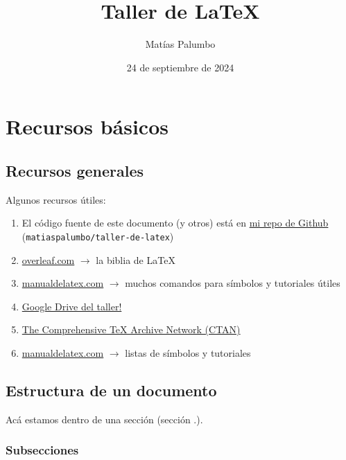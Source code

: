 \documentclass[12pt, spanish]{report}
\title{Taller de \LaTeX}
\author{Matías Palumbo}
\date{24 de septiembre de 2024}
\theoremstyle{definition} %
\theoremstyle{remark} %
\theoremstyle{plain} %
\theoremstyle{plain} %
\theoremstyle{plain} %
\theoremstyle{plain} %
\theoremstyle{plain} %
\theoremstyle{remark} %
\numberwithin{defn}{chapter}
\renewcommand{\thesection}{\arabic{chapter}.\arabic{section}}
\begin{document}

\maketitle

\tableofcontents

\cleardoublepage{}

\chapter{Recursos básicos}

\section{Recursos generales}
\noindent Algunos recursos útiles:
\begin{enumerate}
    \item El código fuente de este documento (y otros) está en \href{https://github.com/matiaspalumbo/taller-de-latex}{mi repo de Github} (\verb|matiaspalumbo/taller-de-latex|)
    \item \href{www.overleaf.com}{overleaf.com} $\to$ la biblia de \LaTeX
    \item \href{www.manualdelatex.com}{manualdelatex.com} $\to$ muchos comandos para símbolos y tutoriales útiles
    \item \href{www.drive.google.com/drive/folders/1OXJNANEtlrzC934mgEcmJNUbtBfR32l9?usp=drive_link}{Google Drive del taller!}
    \item \href{https://ctan.org/?lang=en}{The Comprehensive TeX Archive Network (CTAN)}
    \item \href{https://manualdelatex.com/}{manualdelatex.com} $\to$ listas de símbolos y tutoriales
\end{enumerate}



\section{Estructura de un documento}

Acá estamos dentro de una sección (sección \thesection).

\subsection{Subsecciones}
\end{document}

